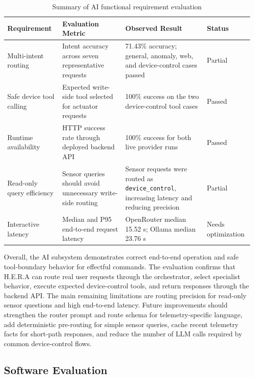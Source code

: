 \begin{table}[H]
\centering
\caption{Summary of AI functional requirement evaluation}
\label{tab:ai_requirement_summary}
\small
\renewcommand{\arraystretch}{1.15}
\begin{tabularx}{\textwidth}{p{3.8cm}X X>{\centering\arraybackslash}p{1.8cm}}
\toprule
\textbf{Requirement} & \textbf{Evaluation Metric} & \textbf{Observed Result} & \textbf{Status} \\
\midrule
Multi-intent routing & Intent accuracy across seven representative requests & 71.43\% accuracy; general, anomaly, web, and device-control cases passed & Partial \\
Safe device tool calling & Expected write-side tool selected for actuator requests & 100\% success on the two device-control tool cases & Passed \\
Runtime availability & HTTP success rate through deployed backend API & 100\% success for both live provider runs & Passed \\
Read-only query efficiency & Sensor queries should avoid unnecessary write-side routing & Sensor requests were routed as \texttt{device\_control}, increasing latency and reducing precision & Partial \\
Interactive latency & Median and P95 end-to-end request latency & OpenRouter median 15.52 s; Ollama median 23.76 s & Needs optimization \\
\bottomrule
\end{tabularx}
\end{table}

Overall, the AI subsystem demonstrates correct end-to-end operation and safe tool-boundary behavior for effectful commands. The evaluation confirms that H.E.R.A can route real user requests through the orchestrator, select specialist behavior, execute expected device-control tools, and return responses through the backend API. The main remaining limitations are routing precision for read-only sensor questions and high end-to-end latency. Future improvements should strengthen the router prompt and route schema for telemetry-specific language, add deterministic pre-routing for simple sensor queries, cache recent telemetry facts for short-path responses, and reduce the number of LLM calls required by common device-control flows.


\subsection{Software Evaluation}


